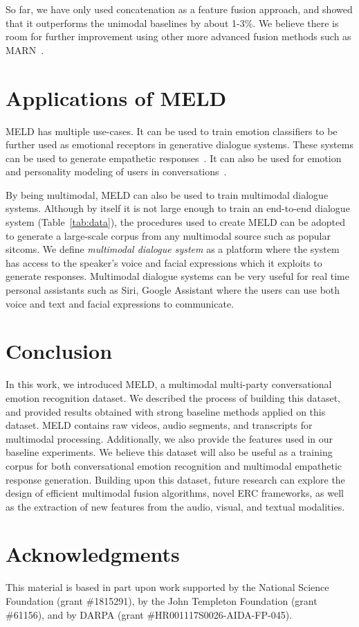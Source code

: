 \documentclass[11pt,a4paper]{article}
\begin{document}
So far, we have only used concatenation as a feature fusion approach, and showed that it outperforms the  unimodal baselines by about 1-3\%. We believe there is room for further improvement using other more advanced fusion methods such as MARN~\citep{zadeh2018multimodal}.

\section{Applications of MELD}
\label{sec:appli}

MELD has multiple use-cases. It can be used to train emotion classifiers to be further used as emotional receptors in generative dialogue systems. These systems can be used to generate empathetic responses~\cite{zhou2017emotional}. It can also be used for emotion and personality modeling of users in conversations~\citep{li2016persona}. 

By being multimodal, MELD can also be used  to train multimodal dialogue systems. Although by itself it is not large enough to train an end-to-end dialogue system (Table~\ref{tab:data}), the procedures used to create MELD can be adopted to generate a large-scale corpus from any multimodal source such as popular sitcoms. We define \emph{multimodal dialogue system} as a platform where the system has access to the speaker's voice and facial expressions which it exploits to generate responses. Multimodal dialogue systems can be very useful for real time personal assistants such as Siri, Google Assistant where the users can use both voice and text and facial expressions to communicate.


\section{Conclusion}
\label{sec:conclusion}

In this work, we introduced MELD, a multimodal multi-party conversational emotion recognition dataset. We described the process of building this dataset,  and provided results obtained with strong baseline methods applied on this dataset. MELD  contains raw videos, audio segments, and transcripts for multimodal processing. Additionally, we also provide the features used in our baseline experiments. We believe this dataset will also be useful as a training corpus for both conversational emotion recognition and multimodal empathetic response generation. Building upon this dataset, future research can explore the design of efficient multimodal fusion algorithms, novel ERC frameworks, as well as the  extraction of new features from the audio, visual, and textual modalities. 


\section*{Acknowledgments}
This material is based in part upon work supported by the National Science Foundation (grant \#1815291), by the John Templeton Foundation (grant \#61156), and by DARPA (grant \#HR001117S0026-AIDA-FP-045). 



\end{document}
